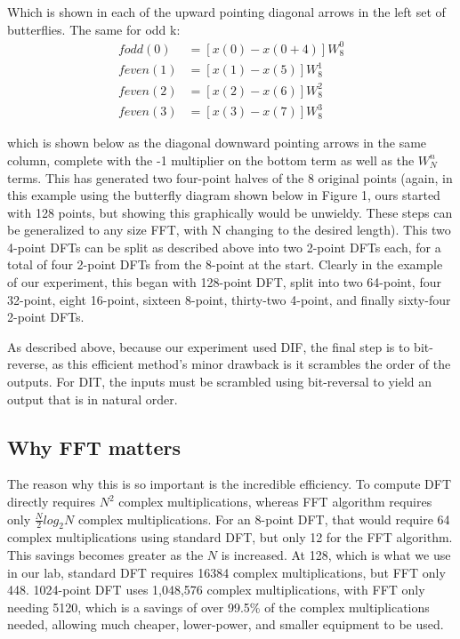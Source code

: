 \documentclass{bannerReport}
\begin{document}
Which is shown in each of the upward pointing diagonal arrows in the left set of butterflies. The same for odd k:
\begin{align*}
	fodd(0)  &= [x(0) - x(0 +4)]W^{0}_{8}\\
feven(1) &=  [x(1) - x(5)]W^{1}_{8}\\
feven(2) &=  [x(2) - x(6)]W^{2}_{8}\\
feven(3) &=  [x(3) - x(7)]W^{3}_{8}
\end{align*}

which is shown below as the diagonal downward pointing arrows in the same column, complete with the -1 multiplier on the bottom term as well as the $W^n_N$ terms. This has generated two four-point halves of the 8 original points (again, in this example using the butterfly diagram shown below in Figure 1, ours started with 128 points, but showing this graphically would be unwieldy. These steps can be generalized to any size FFT, with N changing to the desired length). This two 4-point DFTs can be split as described above into two 2-point DFTs each, for a total of four 2-point DFTs from the 8-point at the start. Clearly in the example of our experiment, this began with 128-point DFT, split into two 64-point, four 32-point, eight 16-point, sixteen 8-point, thirty-two 4-point, and finally sixty-four 2-point DFTs. 



As described above, because our experiment used DIF, the final step is to bit-reverse, as this efficient method's minor drawback is it scrambles the order of the outputs. For DIT, the inputs must be scrambled using  bit-reversal to yield an output that is in natural order.

\subsection{Why FFT matters}
The reason why this is so important is the incredible efficiency. To compute DFT directly requires $N^2$ complex multiplications, whereas FFT algorithm requires only $\frac{N}{2}log_2N$ complex multiplications. For an 8-point DFT, that would require 64 complex multiplications using standard DFT, but only 12 for the FFT algorithm. This savings becomes greater as the $N$ is increased. At 128, which is what we use in our lab, standard DFT requires 16384 complex multiplications, but FFT only 448. 1024-point DFT uses 1,048,576 complex multiplications, with FFT only needing 5120, which is a savings of over 99.5\% of the complex multiplications needed, allowing much cheaper, lower-power, and smaller equipment to be used.
\end{document}
